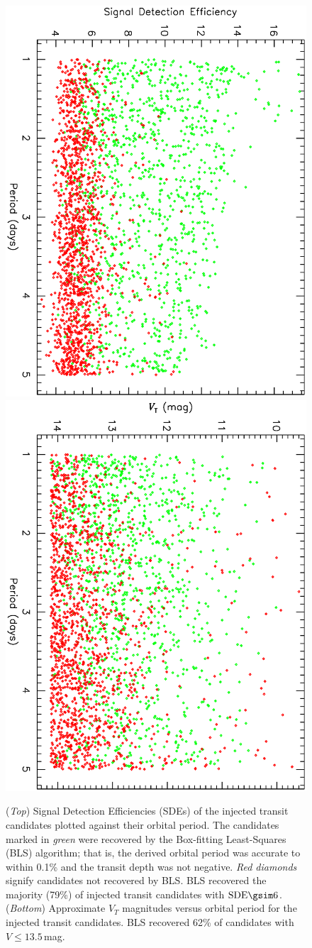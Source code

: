 \begin{figure}
\begin{center}
\centering
\includegraphics[width=.55\textwidth, angle=90]{7_comp_b} \\
\includegraphics[width=.55\textwidth, angle=90]{7_comp_a} \\
\caption[SDE and $V_{T}$ versus period for BLS-recovered transits]{%
({\it Top}) Signal Detection Efficiencies (SDEs) of the injected transit candidates plotted against their orbital period.
The candidates marked in {\it green} were recovered by the Box-fitting Least-Squares (BLS) algorithm; that is, the derived orbital period was accurate to within 0.1\% and the transit depth was not negative.
{\it Red diamonds} signify candidates not recovered by BLS.
BLS recovered the majority (79\%) of injected transit candidates with $\mathrm{SDE}\gsim6$.
({\it Bottom}) Approximate $V_{T}$ magnitudes versus orbital period for the injected transit candidates.
BLS recovered 62\% of candidates with $V\leq13.5$\,mag.%
}
\label{cha:human:sec:model:fig:rec}
\end{center}
\end{figure}

